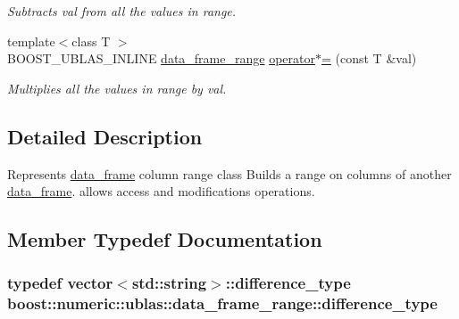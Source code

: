 \begin{DoxyCompactItemize}
\begin{DoxyCompactList}\small\item\em Subtracts {\ttfamily val} from all the values in range. \end{DoxyCompactList}\item 
{\footnotesize template$<$class T $>$ }\\B\+O\+O\+S\+T\+\_\+\+U\+B\+L\+A\+S\+\_\+\+I\+N\+L\+I\+NE \hyperlink{classboost_1_1numeric_1_1ublas_1_1data__frame__range}{data\+\_\+frame\+\_\+range} \hyperlink{classboost_1_1numeric_1_1ublas_1_1data__frame__range_a7aaf278508304604f04a67a363678991}{operator$\ast$=} (const T \&val)
\begin{DoxyCompactList}\small\item\em Multiplies all the values in range by {\ttfamily val}. \end{DoxyCompactList}\end{DoxyCompactItemize}


\subsection{Detailed Description}
Represents \hyperlink{classboost_1_1numeric_1_1ublas_1_1data__frame}{data\+\_\+frame} column range class Builds a range on columns of another \hyperlink{classboost_1_1numeric_1_1ublas_1_1data__frame}{data\+\_\+frame}. allows access and modifications operations. 

\subsection{Member Typedef Documentation}
\subsubsection[{\texorpdfstring{difference\+\_\+type}{difference_type}}]{\setlength{\rightskip}{0pt plus 5cm}typedef vector$<$std\+::string$>$\+::{\bf difference\+\_\+type} {\bf boost\+::numeric\+::ublas\+::data\+\_\+frame\+\_\+range\+::difference\+\_\+type}}\hypertarget{classboost_1_1numeric_1_1ublas_1_1data__frame__range_acb334affe8ebaa8fb9e59296c77072a3}{}\label{classboost_1_1numeric_1_1ublas_1_1data__frame__range_acb334affe8ebaa8fb9e59296c77072a3}
